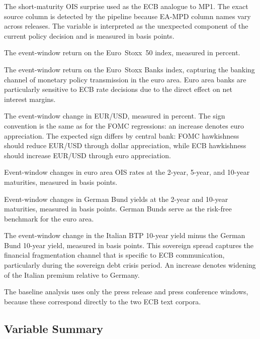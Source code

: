 \begin{description}[noitemsep, leftmargin=2.7cm, font=\normalfont\bfseries]
  \item[OIS\_MP1] The short-maturity OIS surprise used as the ECB
    analogue to MP1. The exact source column is detected by the
    pipeline because EA-MPD column names vary across releases. The
    variable is interpreted as the unexpected component of the
    current policy decision and is measured in basis points.
  \item[SX5E] The event-window return on the Euro~Stoxx~50 index,
    measured in percent.
  \item[SX7E] The event-window return on the Euro~Stoxx Banks index,
    capturing the banking channel of monetary policy transmission in
    the euro area. Euro area banks are particularly sensitive to ECB
    rate decisions due to the direct effect on net interest margins.
  \item[EUR/USD] The event-window change in EUR/USD, measured in
    percent. The sign convention is the same as for the FOMC
    regressions: an increase denotes euro appreciation. The expected
    sign differs by central bank: FOMC hawkishness should reduce
    EUR/USD through dollar appreciation, while ECB hawkishness should
    increase EUR/USD through euro appreciation.
  \item[OIS~2Y, 5Y, 10Y] Event-window changes in euro area OIS
    rates at the 2-year, 5-year, and 10-year maturities, measured
    in basis points.
  \item[DE~2Y, DE~10Y] Event-window changes in German Bund yields
    at the 2-year and 10-year maturities, measured in basis points.
    German Bunds serve as the risk-free benchmark for the euro area.
  \item[IT10Y\_spread] The event-window change in the Italian BTP
    10-year yield minus the German Bund 10-year yield, measured in
    basis points. This sovereign spread captures the financial
    fragmentation channel that is specific to ECB communication,
    particularly during the sovereign debt crisis period. An increase
    denotes widening of the Italian premium relative to Germany.
\end{description}
 
The baseline analysis uses only the press release and press conference
windows, because these correspond directly to the two ECB text corpora.
 

\subsection{Variable Summary}
\label{sec:data_variable_summary}

